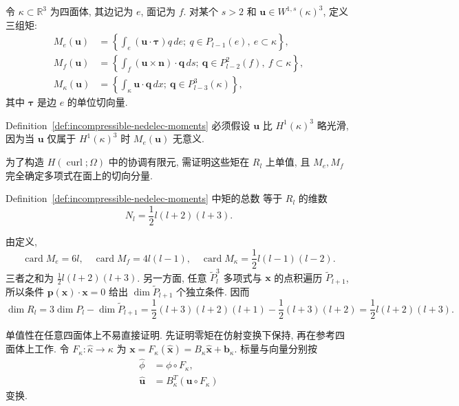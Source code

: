 \begin{Definition}\label{def:incompressible-nedelec-moments}
令 $\kappa\subset\mathbb R^3$ 为四面体, 其边记为 $e$, 面记为 $f$.
对某个 $s>2$ 和
$\mathbf u\in W^{1,s}(\kappa)^3$, 定义三组矩:
\[
\begin{aligned}
M_e(\mathbf u)&=
\left\{\int_e(\mathbf u\cdot\boldsymbol\tau)q\,de;
\ q\in P_{l-1}(e),\ e\subset\kappa\right\},\\
M_f(\mathbf u)&=
\left\{\int_f(\mathbf u\times\mathbf n)\cdot\mathbf q\,ds;
\ \mathbf q\in P_{l-2}^2(f),\ f\subset\kappa\right\},\\
M_\kappa(\mathbf u)&=
\left\{\int_\kappa\mathbf u\cdot\mathbf q\,dx;
\ \mathbf q\in P_{l-3}^3(\kappa)\right\},
\end{aligned}
\]
其中 $\boldsymbol\tau$ 是边 $e$ 的单位切向量.
\end{Definition}

\begin{Remark}\label{rem:incompressible-nedelec-moment-regularity}
Definition~\ref{def:incompressible-nedelec-moments}
必须假设 $\mathbf u$ 比 $H^1(\kappa)^3$ 略光滑,
因为当 $\mathbf u$ 仅属于 $H^1(\kappa)^3$ 时 $M_e(\mathbf u)$ 无意义.
\end{Remark}

为了构造 $H(\operatorname{curl};\Omega)$ 中的协调有限元,
需证明这些矩在 $R_l$ 上单值, 且 $M_e,M_f$
完全确定多项式在面上的切向分量.

\begin{Lemma}\label{lem:incompressible-nedelec-moment-count}
Definition~\ref{def:incompressible-nedelec-moments} 中矩的总数
等于 $R_l$ 的维数
\[
N_l=\frac12l(l+2)(l+3).
\]
\end{Lemma}

\begin{Proof}
由定义,
\[
\operatorname{card}M_e=6l,
\quad
\operatorname{card}M_f=4l(l-1),
\quad
\operatorname{card}M_\kappa=\frac12l(l-1)(l-2).
\]
三者之和为 $\frac12l(l+2)(l+3)$.
另一方面, 任意 $\widetilde P_l^3$ 多项式与
$\mathbf x$ 的点积遍历 $\widetilde P_{l+1}$,
所以条件 $\mathbf p(\mathbf x)\cdot\mathbf x=0$
给出 $\dim\widetilde P_{l+1}$ 个独立条件. 因而
\[
\dim R_l=3\dim P_l-\dim\widetilde P_{l+1}
=\frac12(l+3)(l+2)(l+1)-\frac12(l+3)(l+2)
=\frac12l(l+2)(l+3).
\]
\end{Proof}

单值性在任意四面体上不易直接证明.
先证明零矩在仿射变换下保持, 再在参考四面体上工作.
令 $F_\kappa:\widehat\kappa\to\kappa$ 为
$\mathbf x=F_\kappa(\widehat{\mathbf x})
=B_\kappa\widehat{\mathbf x}+\mathbf b_\kappa$.
标量与向量分别按
\begin{align}
\widehat\phi&=\phi\circ F_\kappa,
\label{eq:incompressible-nedelec-scalar-transform}\\
\widehat{\mathbf u}&=B_\kappa^T(\mathbf u\circ F_\kappa)
\label{eq:incompressible-nedelec-covariant-transform}
\end{align}
变换.

